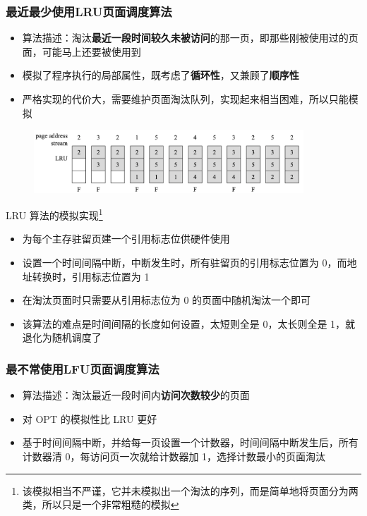 \documentclass[cs4size,a4paper,10pt]{ctexart}
\begin{document}
		\subsubsection{最近最少使用LRU页面调度算法}
		\begin{itemize}
			\item 算法描述：淘汰\textbf{最近一段时间较久未被访问}的那一页，即那些刚被使用过的页面，可能马上还要被使用到
			\item 模拟了程序执行的局部属性，既考虑了\textbf{循环性}，又兼顾了\textbf{顺序性}
			\item 严格实现的代价大，需要维护页面淘汰队列，实现起来相当困难，所以只能模拟
		\end{itemize}
		\begin{figure}[H]
			\centering
			\includegraphics[width=0.9\textwidth]{img/LRU}
		\end{figure}

		LRU 算法的模拟实现\footnote{该模拟相当不严谨，它并未模拟出一个淘汰的序列，而是简单地将页面分为两类，所以只是一个非常粗糙的模拟}
		\begin{itemize}
			\item 为每个主存驻留页建一个引用标志位供硬件使用
			\item 设置一个时间间隔中断，中断发生时，所有驻留页的引用标志位置为 0，而地址转换时，引用标志位置为 1
			\item 在淘汰页面时只需要从引用标志位为 0 的页面中随机淘汰一个即可
			\item 该算法的难点是时间间隔的长度如何设置，太短则全是 0，太长则全是 1，就退化为随机调度了
		\end{itemize}

		\subsubsection{最不常使用LFU页面调度算法}
		\begin{itemize}
			\item 算法描述：淘汰最近一段时间内\textbf{访问次数较少}的页面
			\item 对 OPT 的模拟性比 LRU 更好
			\item 基于时间间隔中断，并给每一页设置一个计数器，时间间隔中断发生后，所有计数器清 0，每访问页一次就给计数器加 1，选择计数最小的页面淘汰
		\end{itemize}
\end{document}
